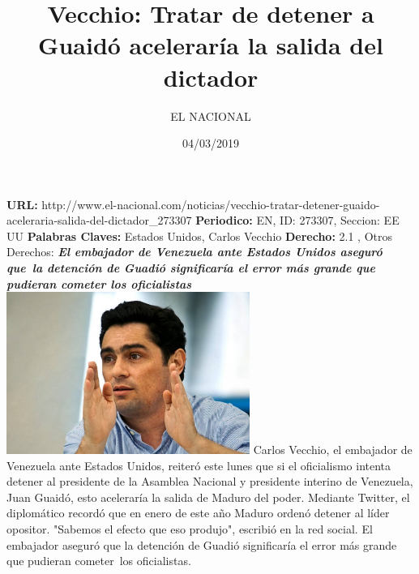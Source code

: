 \documentclass{article}%
\title{\textbf{Vecchio: Tratar de detener a Guaidó aceleraría la salida del dictador}}%
\author{EL NACIONAL}%
\date{04/03/2019}%
\begin{document}
%
\normalsize%
\maketitle%
\textbf{URL: }%
http://www.el{-}nacional.com/noticias/vecchio{-}tratar{-}detener{-}guaido{-}aceleraria{-}salida{-}del{-}dictador\_273307\newline%
%
\textbf{Periodico: }%
EN, %
ID: %
273307, %
Seccion: %
EE UU\newline%
%
\textbf{Palabras Claves: }%
Estados Unidos, Carlos Vecchio\newline%
%
\textbf{Derecho: }%
2.1%
, Otros Derechos: %
\newline%
%
\textbf{\textit{El embajador de Venezuela ante Estados Unidos aseguró que~la detención de Guadió significaría el error más grande que pudieran cometer los oficialistas}}%
\newline%
\newline%
%
\includegraphics[width=300px]{EN_273307.jpg}%
\newline%
%
Carlos Vecchio, el embajador de Venezuela ante Estados Unidos, reiteró este lunes que si el oficialismo intenta detener al presidente de la Asamblea Nacional y presidente interino de Venezuela, Juan Guaidó, esto aceleraría la salida de Maduro del poder.%
\newline%
%
Mediante Twitter, el diplomático recordó que en enero de este año Maduro ordenó detener al líder opositor.%
\newline%
%
"Sabemos el efecto que eso produjo", escribió en la red social.%
\newline%
%
El embajador aseguró que la detención de Guadió significaría el error más grande que pudieran cometer~los oficialistas.%
\newline%
%
\end{document}
